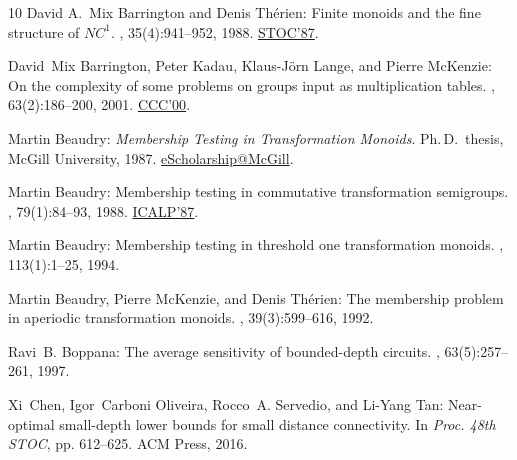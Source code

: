 \documentclass[11pt]{article}
\numberwithin{equation}{section}
\theoremstyle{definition}
\theoremstyle{plain}
\begin{document}
\begin{thebibliography}{10}
{\sc David A.~Mix Barrington and Denis Th{\'e}rien}: Finite monoids and the
  fine structure of {$NC^{1}$}.
, 35(4):941--952, 1988.
\newblock \prelim \href{https://doi.org/10.1145/28395.28407}{STOC'87}.
\newblock [\epfmtdoi{10.1145/48014.63138}]

{\sc David~Mix Barrington, Peter Kadau, Klaus-J\"{o}rn Lange, and Pierre
  McKenzie}: On the complexity of some problems on groups input as
  multiplication tables.
, 63(2):186--200, 2001.
\newblock \prelim \href{https://doi.org/10.1109/CCC.2000.856736}{CCC'00}.

{\sc Martin Beaudry}: {\em Membership Testing in Transformation Monoids}.
\newblock Ph.\,D.\ thesis, McGill University, 1987.
\newblock
  \href{https://escholarship.mcgill.ca/concern/theses/vm40xs37k?locale=en}{eScholarship@McGill}.

{\sc Martin Beaudry}: Membership testing in commutative transformation
  semigroups.
, 79(1):84--93, 1988.
\newblock \prelim
  \href{https://link.springer.com/chapter/10.1007/3-540-18088-5\_47}{ICALP'87}.
\newblock [\epfmtdoi{10.1016/0890-5401(88)90018-1}]

{\sc Martin Beaudry}: Membership testing in threshold one transformation
  monoids.
, 113(1):1--25, 1994.

{\sc Martin Beaudry, Pierre McKenzie, and Denis Th{\'{e}}rien}: The membership
  problem in aperiodic transformation monoids.
, 39(3):599--616, 1992.
\newblock [\epfmtdoi{10.1145/146637.146661}]

{\sc Ravi~B. Boppana}: The average sensitivity of bounded-depth circuits.
, 63(5):257--261, 1997.
\newblock [\epfmtdoi{10.1016/S0020-0190(97)00131-2}]

{\sc Xi~Chen, Igor~Carboni Oliveira, Rocco~A. Servedio, and Li-Yang Tan}:
  Near-optimal small-depth lower bounds for small distance connectivity.
\newblock In {\em Proc. 48th STOC}, pp. 612--625. ACM Press, 2016.


\end{thebibliography}
\end{document}
